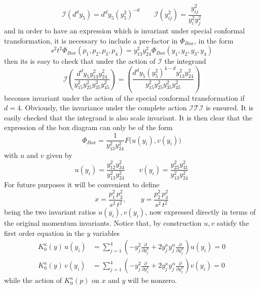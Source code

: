 \documentclass[a4paper,11pt,openright,twoside]{book}
\numberwithin{equation}{section}
\begin{document}
{\begin{equation}
	\mathcal{I} (d^d y_5)=d^d y_5 {(y_5^2)}^{-d}  \qquad \mathcal{I}(y^2_{ij})=\frac{y_{ij}^2}{y_i^2y_j^2}
\end{equation}
and in order to have an expression which is invariant under special conformal transformation, it is necessary to include a pre-factor in $\Phi_{Box}$, in the form  
\begin{equation}
	s^2 t^2 \Phi_{Box}(p_1,p_2,p_3,p_4)= y_{13}^2 y_{24}^2  \Phi_{Box}(y_1,y_2,y_3,y_4)
\end{equation}
then its is easy to check that under the action of $\mathcal{I}$ the integrand 
\begin{equation}
	\mathcal{I} \left(\frac{d^d y_5 y_{13}^2 y_{2 4}^2}{y_{15}^2 y_{25}^2 y_{35}^2 y_{45}^2}\right)= 
	\left(\frac{d^d y_5   (y_5^2)^{4-d}  y_{13}^2 y_{2 4}^2}{y_{15}^2 y_{25}^2 y_{35}^2 y_{45}^2}\right)
\end{equation}
becomes invariant under the action of the special conformal transformation if $d=4$. Obviously, the invariance under the complete action $\mathcal{I T I}$ is ensured. It is easily checked that the integrand is also scale invariant. It is then clear that the expression of the box diagram can only be of the form 
\begin{equation}
	\label{ans1}
	\Phi_{Box}=\frac{1}{y_{13}^2 y_{24}^2}F\big(u(y_i),v(y_i)\big)
\end{equation}
with $u$ and $v$ given by 
\begin{equation}
	\label{uv2}
	u(y_i)=\frac{y_{12}^2 y_{34}^2}{y_{13}^2 y_{24}^2} \qquad v(y_i)=\frac{y_{23}^2 y_{41}^2}{y_{13}^2 y_{24}^2}
\end{equation}
For future purposes it will be convenient to define
\begin{equation}
	\label{quartic}
	x=\frac{p_1^2\,p_3^2}{s^2\,t^2},\qquad y=\frac{p_2^2\,p_4^2}{s^2\,t^2}
\end{equation}
being the two invariant ratios $u(y_i),v(y_i)$, now expressed directly in terms of the original momentum invariants. 
Notice that, by construction $u,v$ satisfy the first order equation in the $y$ variables
\begin{equation}
	\label{firstp}
	\begin{split}
		K_0^\kappa(y)\, u(y_i) &=\sum_{j=1}^{4} \left(- y_j^2\frac{\partial}{\partial y_j^\kappa}+ 2 y_j^\kappa y_j^\alpha \frac{\partial}
		{\partial y_j^\alpha} \right)  u(y_i) =0\\
		K_0^\kappa(y)\, v(y_i) &=\sum_{j=1}^{4} \left(- y_j^2\frac{\partial}{\partial y_j^\kappa}+ 2 y_j^\kappa y_j^\alpha \frac{\partial}
		{\partial y_j^\alpha} \right)  v(y_i) =0
	\end{split}
\end{equation}
while the action of $K_0^\kappa (p)$ on $x$ and $y$ will be nonzero.

}
\end{document}
